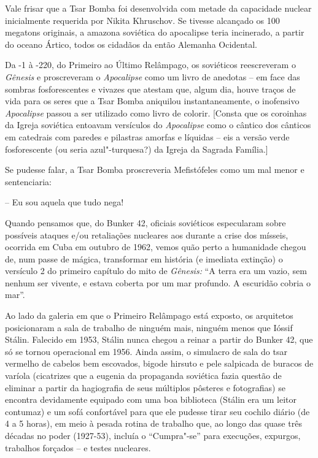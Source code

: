 Vale frisar que a Tsar Bomba foi desenvolvida com metade da capacidade
nuclear inicialmente requerida por Nikita Khruschov. Se tivesse
alcançado os 100 megatons originais, a amazona soviética do apocalipse
teria incinerado, a partir do oceano Ártico, todos os cidadãos da então
Alemanha Ocidental.

Da -1 à -220, do Primeiro ao Último Relâmpago, os soviéticos
reescreveram o \emph{Gênesis} e proscreveram o \emph{Apocalipse} como um
livro de anedotas -- em face das sombras fosforescentes e vivazes que
atestam que, algum dia, houve traços de vida para os seres que a Tsar
Bomba aniquilou instantaneamente, o inofensivo \emph{Apocalipse} passou
a ser utilizado como livro de colorir. {[}Consta que os coroinhas da
Igreja soviética entoavam versículos do \emph{Apocalipse} como o cântico
dos cânticos em catedrais com paredes e pilastras amorfas e líquidas --
eis a versão verde fosforescente (ou seria azul"-turquesa?) da Igreja da
Sagrada Família.{]}

Se pudesse falar, a Tsar Bomba proscreveria Mefistófeles como um mal
menor e sentenciaria: 

-- Eu sou aquela que tudo nega!

Quando pensamos que, do Bunker 42, oficiais soviéticos especularam sobre
possíveis ataques e/ou retaliações nucleares aos  durante a crise dos
mísseis, ocorrida em Cuba em outubro de 1962, vemos quão perto a
humanidade chegou de, num passe de mágica, transformar em história (e
imediata extinção) o versículo 2 do primeiro capítulo do mito de
\emph{Gênesis:} ``A terra era um vazio, sem nenhum ser vivente, e estava
coberta por um mar profundo. A escuridão cobria o mar''.

Ao lado da galeria em que o Primeiro Relâmpago está exposto, os
arquitetos posicionaram a sala de trabalho de ninguém mais, ninguém
menos que Ióssif Stálin. Falecido em 1953, Stálin nunca chegou a reinar
a partir do Bunker 42, que só se tornou operacional em 1956. Ainda
assim, o simulacro de sala do tsar vermelho de cabelos bem escovados,
bigode hirsuto e pele salpicada de buracos de varíola (cicatrizes que a
eugenia da propaganda soviética fazia questão de eliminar a partir da
hagiografia de seus múltiplos pôsteres e fotografias) se encontra
devidamente equipado com uma boa biblioteca (Stálin era um leitor
contumaz) e um sofá confortável para que ele pudesse tirar seu cochilo
diário (de 4 a 5 horas), em meio à pesada rotina de trabalho que, ao
longo das quase três décadas no poder (1927-53), incluía o ``Cumpra"-se''
para execuções, expurgos, trabalhos forçados -- e testes nucleares.

